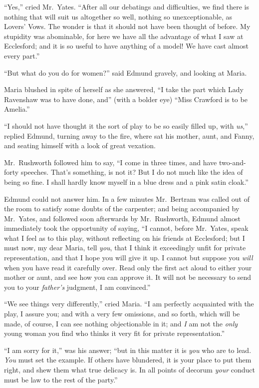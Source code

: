 \documentclass{article}
\begin{document}
``Yes,'' cried Mr.\ Yates.  ``After all our debatings
and difficulties, we find there is nothing that will
suit us altogether so well, nothing so unexceptionable,
as Lovers' Vows.  The wonder is that it should not have been
thought of before.  My stupidity was abominable, for here
we have all the advantage of what I saw at Ecclesford;
and it is so useful to have anything of a model!
We have cast almost every part.''

``But what do you do for women?'' said Edmund gravely,
and looking at Maria.

Maria blushed in spite of herself as she answered,
``I take the part which Lady Ravenshaw was to have done,
and'' (with a bolder eye) ``Miss Crawford is to be Amelia.''

``I should not have thought it the sort of play to be so
easily filled up, with \emph{us},'' replied Edmund, turning away
to the fire, where sat his mother, aunt, and Fanny,
and seating himself with a look of great vexation.

Mr.\ Rushworth followed him to say, ``I come in three times,
and have two-and-forty speeches.  That's something,
is not it?  But I do not much like the idea of being so fine.
I shall hardly know myself in a blue dress and a pink
satin cloak.''

Edmund could not answer him.  In a few minutes Mr.\ Bertram
was called out of the room to satisfy some doubts
of the carpenter; and being accompanied by Mr.\ Yates,
and followed soon afterwards by Mr.\ Rushworth, Edmund almost
immediately took the opportunity of saying, ``I cannot,
before Mr.\ Yates, speak what I feel as to this play,
without reflecting on his friends at Ecclesford;
but I must now, my dear Maria, tell \emph{you}, that I
think it exceedingly unfit for private representation,
and that I hope you will give it up.  I cannot but suppose
you \emph{will} when you have read it carefully over.
Read only the first act aloud to either your mother or aunt,
and see how you can approve it.  It will not be necessary
to send you to your \emph{father's} judgment, I am convinced.''

``We see things very differently,'' cried Maria.
``I am perfectly acquainted with the play, I assure you;
and with a very few omissions, and so forth, which will
be made, of course, I can see nothing objectionable in it;
and \emph{I} am not the \emph{only} young woman you find who thinks
it very fit for private representation.''

``I am sorry for it,'' was his answer; ``but in this matter
it is \emph{you} who are to lead.  \emph{You} must set the example.
If others have blundered, it is your place to put
them right, and shew them what true delicacy is.
In all points of decorum \emph{your} conduct must be law
to the rest of the party.''
\end{document}
